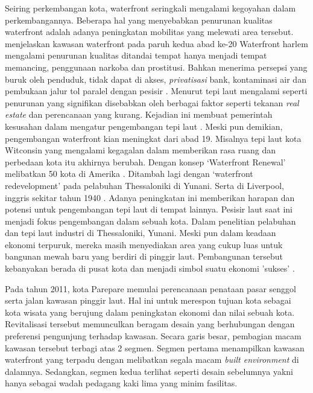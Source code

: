 \documentclass[../projects/thesis.tex]{subfiles}
\begin{document}
Seiring perkembangan kota, waterfront seringkali mengalami kegoyahan dalam perkembangannya. Beberapa hal yang menyebabkan penurunan kualitas  waterfront adalah adanya peningkatan mobilitas yang melewati area tersebut\citep{richarda.lehmann1966}. \cite{ulam2009} menjelaskan kawasan waterfront pada paruh kedua abad ke-20 Waterfront harlem mengalami penurunan kualitas ditandai tempat hanya menjadi tempat memancing, penggunaan narkoba dan prostitusi. Bahkan menerima persepsi yang buruk oleh penduduk, tidak dapat di akses, \textit{privatisasi} bank, kontaminasi air dan pembukaan jalur tol paralel dengan pesisir \citep{shamsuddin2013}. Menurut \cite{benages2015revisiting} tepi laut mengalami seperti penurunan yang signifikan disebabkan oleh berbagai faktor seperti tekanan \textit{real estate} dan perencanaan yang kurang. Kejadian ini membuat pemerintah kesusahan dalam mengatur pengembangan tepi laut \citep{gripaios1999ports}.
Meski pun demikian, pengembangan waterfront kian meningkat dari abad 19. Misalnya tepi laut kota Witconsin yang mengalami kegagalan dalam memberikan rasa ruang dan perbedaan kota itu akhirnya berubah. Dengan konsep `Waterfront Renewal' melibatkan 50 kota di Amerika \citep{richarda.lehmann1966}. Ditambah lagi dengan `waterfront redevelopment' pada pelabuhan Thessaloniki di Yunani. Serta di Liverpool, inggris sekitar tahun 1940 \citep{couch2003city}. Adanya peningkatan ini memberikan harapan dan potensi untuk pengembangan tepi laut di tempat lainnya.
Pesisir laut saat ini menjadi fokus pengembangan dalam sebuah kota. Dalam penelitian pelabuhan dan tepi laut industri di Thessaloniki, Yunani. Meski pun dalam keadaan ekonomi terpuruk, mereka masih menyediakan area yang cukup luas untuk bangunan mewah baru yang berdiri di pinggir laut. Pembangunan tersebut kebanyakan berada di pusat kota dan menjadi simbol suatu ekonomi 'sukses' \citep{vayona2011}.

Pada tahun 2011, kota Parepare memulai perencanaan penataan pasar senggol serta jalan kawasan pinggir laut. Hal ini untuk merespon tujuan kota sebagai kota wisata yang berujung dalam peningkatan ekonomi dan nilai sebuah kota. Revitalisasi tersebut memunculkan beragam desain yang berhubungan dengan  preferensi pengunjung terhadap kawasan. Secara garis besar, pembagian macam kawasan tersebut terbagi atas 2 segmen. Segmen pertama menampilkan kawasan waterfront yang terpadu dengan melibatkan segala macam \textit{built environment} di dalamnya. Sedangkan, segmen kedua terlihat seperti desain sebelumnya yakni hanya sebagai wadah pedagang kaki lima yang minim fasilitas.
\end{document}

